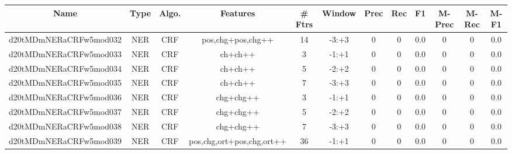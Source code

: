 \documentclass[a4paper]{article}
\begin{document}
\begin{landscape}
\begin{center}
\begin{tabular}{ |c|c|c|c|c|c|c|c|c|c|c|c|}
 \hline
\end{tabular}
\end{center}




\begin{center}
\begin{tabular}{ |c|c|c|c|c|c|c|c|c|c|c|c|} 
 \hline
 	Name & Type & Algo. & Features & \# Ftrs & Window & Prec & Rec & F1 & M-Prec & M-Rec & M-F1\\
 \hline

 	

 
 	
 	\small{ d20tMDmNERaCRFw5mod032 } & \small{ NER} & \small{  CRF }  & pos,chg+pos,chg++  &  14 &  \small{  -3:+3 }  &  0 & 0 & 0.0  &  0 & 0 & 0.0 \\
 	

 
 	
 	\small{ d20tMDmNERaCRFw5mod033 } & \small{ NER} & \small{  CRF }  & ch+ch++  &  3 &  \small{  -1:+1 }  &  0 & 0 & 0.0  &  0 & 0 & 0.0 \\
 	

 
 	
 	\small{ d20tMDmNERaCRFw5mod034 } & \small{ NER} & \small{  CRF }  & ch+ch++  &  5 &  \small{  -2:+2 }  &  0 & 0 & 0.0  &  0 & 0 & 0.0 \\
 	

 
 	
 	\small{ d20tMDmNERaCRFw5mod035 } & \small{ NER} & \small{  CRF }  & ch+ch++  &  7 &  \small{  -3:+3 }  &  0 & 0 & 0.0  &  0 & 0 & 0.0 \\
 	

 
 	
 	\small{ d20tMDmNERaCRFw5mod036 } & \small{ NER} & \small{  CRF }  & chg+chg++  &  3 &  \small{  -1:+1 }  &  0 & 0 & 0.0  &  0 & 0 & 0.0 \\
 	

 
 	
 	\small{ d20tMDmNERaCRFw5mod037 } & \small{ NER} & \small{  CRF }  & chg+chg++  &  5 &  \small{  -2:+2 }  &  0 & 0 & 0.0  &  0 & 0 & 0.0 \\
 	

 
 	
 	\small{ d20tMDmNERaCRFw5mod038 } & \small{ NER} & \small{  CRF }  & chg+chg++  &  7 &  \small{  -3:+3 }  &  0 & 0 & 0.0  &  0 & 0 & 0.0 \\
 	

 
 	
 	\small{ d20tMDmNERaCRFw5mod039 } & \small{ NER} & \small{  CRF }  & pos,chg,ort+pos,chg,ort++  &  36 &  \small{  -1:+1 }  &  0 & 0 & 0.0  &  0 & 0 & 0.0 \\
 	


\end{tabular}
\end{center}
\end{landscape}
\end{document}
